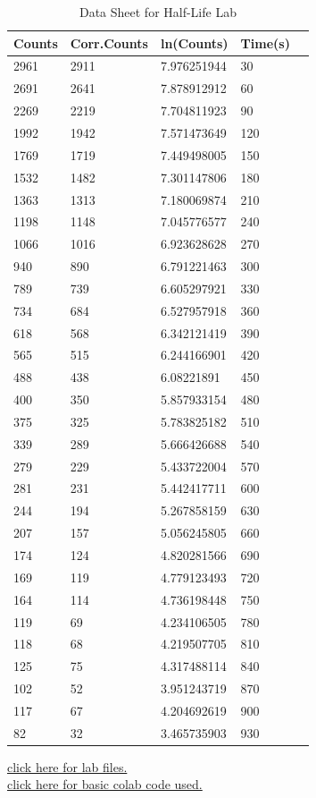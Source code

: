 \documentclass[twocolumn]{article}
\begin{document}
$$$$


\begin{table}[h!]
\centering
\caption{Data Sheet for Half-Life Lab}
\begin{tabular}{|l|l|l|l|l|}
\hline
Counts & Corr.Counts & ln(Counts) & Time(s) \\
\hline
2961 & 2911 & 7.976251944 & 30 \\
\hline
2691 & 2641 & 7.878912912 & 60 \\
\hline
2269 & 2219 & 7.704811923 & 90 \\
\hline
1992 & 1942 & 7.571473649 & 120 \\
\hline
1769 & 1719 & 7.449498005 & 150 \\
\hline
1532 & 1482 & 7.301147806 & 180 \\
\hline
1363 & 1313 & 7.180069874 & 210 \\
\hline
1198 & 1148 & 7.045776577 & 240 \\
\hline
1066 & 1016 & 6.923628628 & 270 \\
\hline
940 & 890 & 6.791221463 & 300 \\
\hline
789 & 739 & 6.605297921 & 330 \\
\hline
734 & 684 & 6.527957918 & 360 \\
\hline
618 & 568 & 6.342121419 & 390 \\
\hline
565 & 515 & 6.244166901 & 420 \\
\hline
488 & 438 & 6.08221891 & 450 \\
\hline
400 & 350 & 5.857933154 & 480 \\
\hline
375 & 325 & 5.783825182 & 510 \\
\hline
339 & 289 & 5.666426688 & 540 \\
\hline
279 & 229 & 5.433722004 & 570 \\
\hline
281 & 231 & 5.442417711 & 600 \\
\hline
244 & 194 & 5.267858159 & 630 \\
\hline
207 & 157 & 5.056245805 & 660 \\
\hline
174 & 124 & 4.820281566 & 690 \\
\hline
169 & 119 & 4.779123493 & 720 \\
\hline
164 & 114 & 4.736198448 & 750 \\
\hline
119 & 69 & 4.234106505 & 780 \\
\hline
118 & 68 & 4.219507705 & 810 \\
\hline
125 & 75 & 4.317488114 & 840 \\
\hline
102 & 52 & 3.951243719 & 870 \\
\hline
117 & 67 & 4.204692619 & 900 \\
\hline
82 & 32 & 3.465735903 & 930 \\
\bottomrule
\end{tabular}
\end{table}
\newpage 
\href{https://github.com/fnuArsh/Radioactivity_lab}{click here for lab files.}\\
\href{https://colab.research.google.com/drive/1xOXSxfqtyZU8cyClQZAxoPkxcLuAKhI2?usp=sharing}{click here for basic colab code used.}
\end{document}

